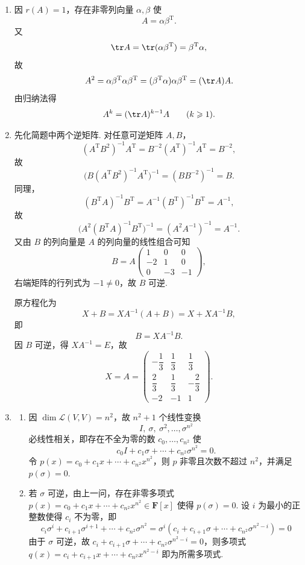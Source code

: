 \begin{enumerate}
    \item 因 $r(A)=1$，存在非零列向量 $\alpha,\beta$ 使
    \[
        A=\alpha\beta^\mathrm{T}.
    \]
    又
    \[
        \tr A=\tr(\alpha\beta^\mathrm{T})=\beta^\mathrm{T}\alpha,
    \]
    故
    \[
        A^2=\alpha\beta^\mathrm{T}\alpha\beta^\mathrm{T}
        =(\beta^\mathrm{T}\alpha)\alpha\beta^\mathrm{T}
        =(\tr A)A.
    \]
    由归纳法得
    \[
        A^k=(\tr A)^{k-1}A\qquad(k\geqslant 1).
    \]

    \item 先化简题中两个逆矩阵. 对任意可逆矩阵 $A,B$，
    \[
        (A^\mathrm{T}B^2)^{-1}A^\mathrm{T}=B^{-2}(A^\mathrm{T})^{-1}A^\mathrm{T}=B^{-2},
    \]
    故
    \[
        \bigl(B(A^\mathrm{T}B^2)^{-1}A^\mathrm{T}\bigr)^{-1}
        =(BB^{-2})^{-1}=B.
    \]
    同理，
    \[
        (B^\mathrm{T}A)^{-1}B^\mathrm{T}=A^{-1}(B^\mathrm{T})^{-1}B^\mathrm{T}=A^{-1},
    \]
    故
    \[
        \bigl(A^2(B^\mathrm{T}A)^{-1}B^\mathrm{T}\bigr)^{-1}
        =(A^2A^{-1})^{-1}=A^{-1}.
    \]
    又由 $B$ 的列向量是 $A$ 的列向量的线性组合可知
    \[
        B=A\begin{pmatrix}
            1&0&0\\
            -2&1&0\\
            0&-3&-1
        \end{pmatrix},
    \]
    右端矩阵的行列式为 $-1\neq 0$，故 $B$ 可逆.

    原方程化为
    \[
        X+B=XA^{-1}(A+B)=X+XA^{-1}B,
    \]
    即
    \[
        B=XA^{-1}B.
    \]
    因 $B$ 可逆，得 $XA^{-1}=E$，故
    \[
        X=A=\begin{pmatrix}
            -\dfrac13&\dfrac13&\dfrac13\\[4pt]
            \dfrac23&\dfrac13&-\dfrac23\\[4pt]
            -2&-1&1
        \end{pmatrix}.
    \]

    \item
    \begin{enumerate}
        \item 因 $\dim\mathcal{L}(V,V)=n^2$，故 $n^2+1$ 个线性变换
        \[
            I,\ \sigma,\ \sigma^2,\ldots,\sigma^{n^2}
        \]
        必线性相关，即存在不全为零的数 $c_0,\ldots,c_{n^2}$ 使
        \[
            c_0I+c_1\sigma+\cdots+c_{n^2}\sigma^{n^2}=0.
        \]
        令 $p(x)=c_0+c_1x+\cdots+c_{n^2}x^{n^2}$，则 $p$ 非零且次数不超过 $n^2$，并满足 $p(\sigma)=0$.

        \item 若 $\sigma$ 可逆，由上一问，存在非零多项式 $p(x)=c_0+c_1x+\cdots+c_{n^2}x^{n^2} \in \mathbf{F}[x]$ 使得 $p(\sigma)=0$. 设 $i$ 为最小的正整数使得 $c_i$ 不为零，即
        \[
            c_i \sigma^i + c_{i+1}\sigma^{i+1} + \cdots + c_{n^2}\sigma^{n^2}=\sigma^i(c_i + c_{i+1}\sigma + \cdots + c_{n^2}\sigma^{n^2-i})=0
        \]
        由于 $\sigma$ 可逆，故 $c_i + c_{i+1}\sigma + \cdots + c_{n^2}\sigma^{n^2-i} = 0$，则多项式 $q(x)=c_i + c_{i+1}x + \cdots + c_{n^2}x^{n^2-i}$ 即为所需多项式.


\end{enumerate}
\end{enumerate}
